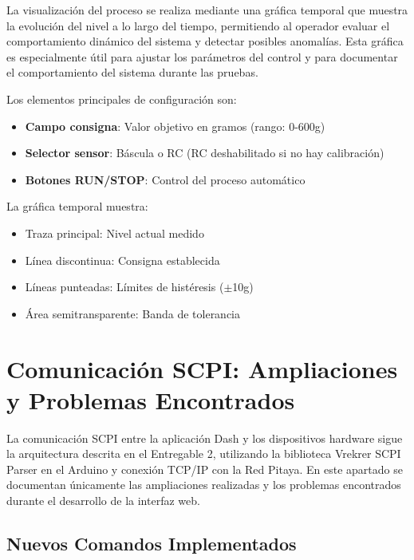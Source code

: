 \documentclass[12pt,a4paper]{article}
\begin{document}
La visualización del proceso se realiza mediante una gráfica temporal que muestra la evolución del nivel a lo largo del tiempo, permitiendo al operador evaluar el comportamiento dinámico del sistema y detectar posibles anomalías. Esta gráfica es especialmente útil para ajustar los parámetros del control y para documentar el comportamiento del sistema durante las pruebas.

Los elementos principales de configuración son:

\begin{itemize}
    \item \textbf{Campo consigna}: Valor objetivo en gramos (rango: 0-600g)
    \item \textbf{Selector sensor}: Báscula o RC (RC deshabilitado si no hay calibración)
    \item \textbf{Botones RUN/STOP}: Control del proceso automático
\end{itemize}

La gráfica temporal muestra:
\begin{itemize}
    \item Traza principal: Nivel actual medido
    \item Línea discontinua: Consigna establecida
    \item Líneas punteadas: Límites de histéresis ($\pm$10g)
    \item Área semitransparente: Banda de tolerancia
\end{itemize}



\section{Comunicación SCPI: Ampliaciones y Problemas Encontrados}

La comunicación SCPI entre la aplicación Dash y los dispositivos hardware sigue la arquitectura descrita en el Entregable 2, utilizando la biblioteca Vrekrer SCPI Parser en el Arduino y conexión TCP/IP con la Red Pitaya. En este apartado se documentan únicamente las ampliaciones realizadas y los problemas encontrados durante el desarrollo de la interfaz web.

\subsection{Nuevos Comandos Implementados}
\end{document}
